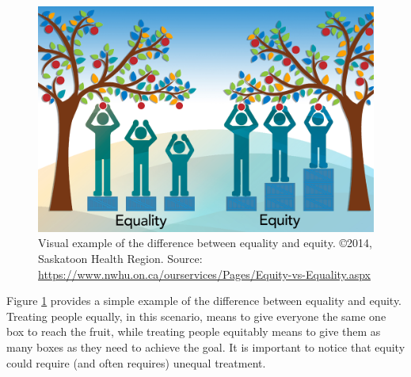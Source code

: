 \begin{figure}[h!]
\includegraphics[scale=.5]{figures/equality_vs_equity.jpg}
\centering
\caption{Visual example of the difference between equality and equity.\newline
\copyright 2014, Saskatoon Health Region. Source: \protect\url{https://www.nwhu.on.ca/ourservices/Pages/Equity-vs-Equality.aspx}}
\label{fig:equality_vs_equity}
\end{figure}

Figure \ref{fig:equality_vs_equity} provides a simple example of the difference between equality and equity. Treating people equally, in this scenario, means to give everyone the same one box to reach the fruit, while treating people equitably means to give them as many boxes as they need to achieve the goal. It is important to notice that equity could require (and often requires) unequal treatment.

